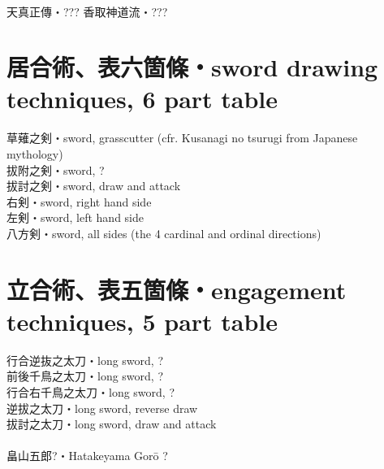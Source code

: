 \documentclass[dvipdfmx, a4paper, 12pt]{utarticle}
\begin{document}
\begin{CJK*}{UTF8}{min}
\begin{landscape}
\setcounter{section}{0}
\newpage
\pagestyle{empty}
\section{}
\noindent {}\\
\\
\\
\\
\\
\\
\section{}
\noindent {}\\
\\
\\
\\
\\
\\

\setcounter{section}{0}
\newpage
\pagestyle{empty}
天真正傳・???
香取神道流・???
\section{居合術、表六箇條・sword drawing techniques, 6 part table}
\noindent 草薙之剣・sword, grasscutter (cfr. Kusanagi no tsurugi from Japanese mythology)\\
拔附之剣・sword, ?\\
拔討之剣・sword, draw and attack\\
右剣・sword, right hand side\\
左剣・sword, left hand side\\
八方剣・sword, all sides (the 4 cardinal and ordinal directions)\\
\section{立合術、表五箇條・engagement techniques, 5 part table}
\noindent 行合逆抜之太刀・long sword, ?\\
前後千鳥之太刀・long sword, ?\\
行合右千鳥之太刀・long sword, ?\\
逆拔之太刀・long sword, reverse draw\\
拔討之太刀・long sword, draw and attack\\
\\
畠山五郎?・Hatakeyama Gor\={o} ?



\end{landscape}
\end{CJK*}
\end{document}
